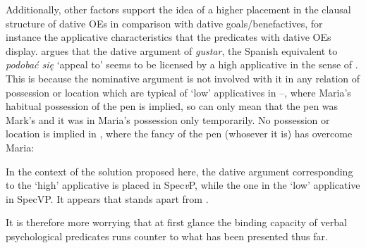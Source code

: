 \documentclass[output=paper,modfonts,nonflat
]{langsci/langscibook}
\begin{document}
\noindent Additionally, other factors support the idea of a higher placement in the clausal structure of dative OEs in comparison with dative goals/benefactives, for instance the applicative characteristics that the predicates with dative OEs display. \cite{cuervo2003} argues that the dative argument of \textit{gustar}, the Spanish equivalent to \textit{podobać się}  ‘appeal to’ seems to be licensed by a high applicative in the sense of \cite{pylkkanen2002}. This is because the nominative argument is not involved with it in any relation of possession or location which are typical of ‘low’ applicatives in --, where Maria’s habitual possession of the pen is implied, so  can only mean that the pen was Mark’s and it was in Maria’s  possession only temporarily. No possession or location is implied in , where the fancy of the pen (whosever it is) has overcome Maria:

\ea \label{ex:witkos:39}
	\z
\z

\ea \label{ex:witkos:40}
	\z
\z
                        
\noindent In the context of the solution proposed here, the dative argument corresponding to the ‘high’ applicative is placed in Spec\textit{v}P, while the one in the ‘low’ applicative in SpecVP. It appears that   stands apart from .

It is therefore more worrying that at first glance the binding capacity of verbal psychological predicates runs counter to what has been presented thus far.
\end{document}
